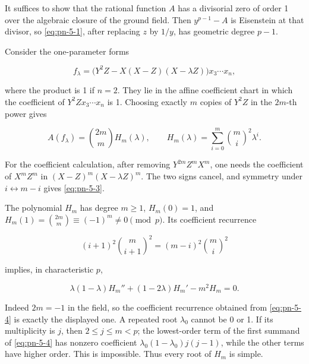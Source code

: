 \documentclass[11pt]{article}
\begin{document}
It suffices to show that the rational function \(A\) has a divisorial
zero of order 1 over the algebraic closure of the ground field. Then
\(y^{p-1}-A\) is Eisenstein at that divisor, so \eqref{eq:pn-5-1}, after replacing
\(z\) by \(1/y\), has geometric degree \(p-1\).

Consider the one-parameter forms

\begin{equation}
 f_\lambda=
 \bigl(Y^2Z-X(X-Z)(X-\lambda Z)\bigr)x_3\cdots x_n,                       \label{eq:pn-5-2}
\end{equation}

where the product is 1 if \(n=2\). They lie in the affine coefficient
chart in which the coefficient of \(Y^2Zx_3\cdots x_n\) is 1.
Choosing exactly \(m\) copies of \(Y^2Z\) in the \(2m\)-th power gives

\begin{equation}
 A(f_\lambda)=\binom{2m}{m}H_m(\lambda),\qquad
 H_m(\lambda)=\sum_{i=0}^m\binom mi^2\lambda^i.                          \label{eq:pn-5-3}
\end{equation}

For the coefficient calculation, after removing \(Y^{2m}Z^mX^m\), one
needs the coefficient of \(X^mZ^m\) in
\((X-Z)^m(X-\lambda Z)^m\). The two signs cancel, and symmetry under
\(i\leftrightarrow m-i\) gives \eqref{eq:pn-5-3}.

The polynomial \(H_m\) has degree \(m\geq1\),
\(H_m(0)=1\), and
\(H_m(1)=\binom{2m}{m}\equiv(-1)^m\neq0\pmod p\).
Its coefficient recurrence

\begin{equation}
 (i+1)^2\binom m{i+1}^2=(m-i)^2\binom mi^2
\end{equation}

implies, in characteristic \(p\),

\begin{equation}
 \lambda(1-\lambda)H_m''+(1-2\lambda)H_m'-m^2H_m=0.                     \label{eq:pn-5-4}
\end{equation}

Indeed \(2m=-1\) in the field, so the coefficient recurrence obtained
from \eqref{eq:pn-5-4} is exactly the displayed one. A repeated root \(\lambda_0\)
cannot be 0 or 1. If its multiplicity is \(j\), then
\(2\leq j\leq m<p\); the lowest-order term of the first summand of
\eqref{eq:pn-5-4} has nonzero coefficient
\(\lambda_0(1-\lambda_0)j(j-1)\), while the other terms have higher
order. This is impossible. Thus every root of \(H_m\) is simple.
\end{document}
